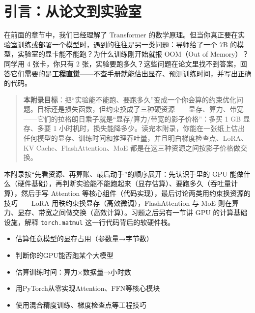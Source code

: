 
\section*{引言：从论文到实验室}


在前面的章节中，我们已经理解了 Transformer 的数学原理。但当你真正要在实验室训练或部署一个模型时，遇到的往往是另一类问题：导师给了一个 7B 的模型，实验室的显卡能不能跑？为什么训练刚开始就报 OOM（Out of Memory）？同学用 4 张卡，你只有 2 张，实验要跑多久？这些问题在论文里找不到答案，回答它们需要的是\textbf{工程直觉}——不查手册就能估出显存、预测训练时间，并写出正确的代码。

\begin{quote}
\textbf{本附录目标}：把“实验能不能跑、要跑多久”变成一个你会算的约束优化问题。目标还是损失函数，但约束换成了三种硬资源——显存、算力、带宽——它们的拉格朗日乘子就是“显存/算力/带宽的影子价格”：多买 1 GB 显存、多要 1 小时机时，损失能降多少。读完本附录，你能在一张纸上估出任何模型的显存、训练时间和推理吞吐量，并且明白梯度检查点、LoRA、KV Cache、FlashAttention、MoE 都是在这三种资源之间按影子价格做交换。
\end{quote}

本附录按“先看资源、再算账、最后动手”的顺序展开：先认识手里的 GPU 能做什么（硬件基础），再判断实验能不能跑起来（显存估算）、要跑多久（吞吐量计算），然后手写 Attention 等核心组件（代码实现），最后讨论两类用约束换资源的技巧——LoRA 用秩约束换显存（高效微调），FlashAttention 与 MoE 则在算力、显存、带宽之间做交换（高效计算）。习题之后另有一节讲 GPU 的计算基础设施，解释 \texttt{torch.matmul} 这一行代码背后的软硬件栈。

\begin{tcolorbox}[colback=green!5, colframe=green!60!black, title=学完本附录，你将能够...]
\begin{itemize}
    \item 估算任意模型的显存占用（参数量→字节数）
    \item 判断你的GPU能否跑某个大模型
    \item 估算训练时间：算力×数据量→小时数
    \item 用PyTorch从零实现Attention、FFN等核心模块
    \item 使用混合精度训练、梯度检查点等工程技巧
\end{itemize}
\end{tcolorbox}

